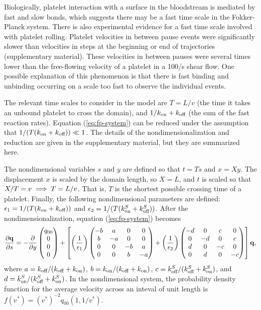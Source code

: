 \documentclass{biophys-new}
\newcommand{\Pder}[2]{\frac{\partial #1}{\partial #2}}
\begin{document}
Biologically, platelet interaction with a surface in the bloodstream
is mediated by fast and slow bonds, which suggests there may be a fast
time scale in the Fokker-Planck system. There is also experimental
evidence for a fast time scale involved with platelet
rolling. Platelet velocities in between pause events were
significantly slower than velocities in steps at the beginning or end
of trajectories (supplementary material). These velocities in between
pauses were several times lower than the free-flowing velocity of a
platelet in a 100/s shear flow. One possible explanation of this
phenomenon is that there is fast binding and unbinding occurring on a
scale too fast to observe the individual events.

The relevant time scales to consider in the model are $T = L / v$ (the
time it takes an unbound platelet to cross the domain), and
$1 / k_\textnormal{on} + k_\textnormal{off}$ (the sum of the fast reaction
rates). Equation (\ref{eq:fp-system}) can be reduced under the
assumption that $1 / (T (k_\textnormal{on} + k_\textnormal{off})) \ll 1$. The details
of the nondimensionalization and reduction are given in the
supplementary material, but they are summarized here.

The nondimensional variables $s$ and $y$ are defined so that $t = Ts$
and $x = Xy$. The displacement $x$ is scaled by the domain length, so
$X = L$, and $t$ is scaled so that
$X/T = v \implies T = L/v$. That is, $T$ is the shortest
possible crossing time of a platelet. Finally, the following
nondimensional parameters are defined:
$\epsilon_1 = 1/(T(k_\textnormal{on} + k_\textnormal{off}))$ and
$\epsilon_2 = 1/(T(k^S_\textnormal{on} + k^S_\textnormal{off}))$. After the
nondimensionalization, equation (\ref{eq:fp-system}) becomes
\begin{equation}
  \label{eq:nd-system}
  \Pder{\vect{q}}{s} = -\Pder{}{y}
  \begin{pmatrix}
    q_{00} \\ 0 \\ 0 \\ 0
  \end{pmatrix}
  + \left[\left(\frac{1}{\epsilon_1}\right) 
  \begin{pmatrix}
    - b & a & 0 & 0 \\
    b & - a & 0 & 0 \\
    0 & 0 & - b & a \\
    0 & 0 & b & - a
  \end{pmatrix} + \left(\frac{1}{\epsilon_2}\right)
  \begin{pmatrix}
    - d & 0 & c & 0 \\
    0 & - d & 0 & c \\
    d & 0 & - c & 0 \\
    0 & d & 0 & - c
  \end{pmatrix}\right]
  \vect{q},
\end{equation}
where $a = k_\textnormal{off}/(k_\textnormal{off} + k_\textnormal{on})$,
$b = k_\textnormal{on}/(k_\textnormal{off} + k_\textnormal{on})$,
$c = k^S_\textnormal{off}/(k^S_\textnormal{off} + k^S_\textnormal{on})$, and
$d = k^S_\textnormal{on}/(k^S_\textnormal{off} + k^S_\textnormal{on})$. In the nondimensional
system, the probability density function for the average velocity
across an inteval of unit length is $f(v^*) = ({v^*})^{-2} q_{00}
\left(1, 1/v^*\right)$.
\end{document}
